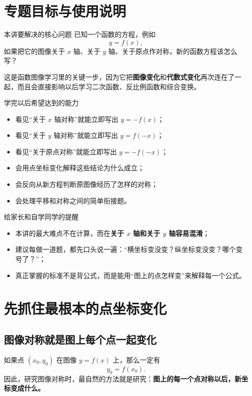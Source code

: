 \documentclass[11pt,a4paper,fontset=fandol]{ctexart}
\theoremstyle{formaltheorem}
\theoremstyle{formalexample}
\newcommand{\basef}{y=f(x)}
\begin{document}
\pagestyle{plain}
\tableofcontents
\newpage
\pagestyle{fancy}

\section{专题目标与使用说明}

\begin{goalbox}{本讲要解决的核心问题}
已知一个函数的方程，例如
\[
y=f(x),
\]
如果把它的图像关于 $x$ 轴、关于 $y$ 轴、关于原点作对称，新的函数方程该怎么写？

这是函数图像学习里的关键一步，因为它把\textbf{图像变化}和\textbf{代数式变化}再次连在了一起，而且会直接影响以后学习二次函数、反比例函数和综合变换。
\end{goalbox}

\begin{goalbox}{学完以后希望达到的能力}
\begin{itemize}
  \item 看见“关于 $x$ 轴对称”就能立即写出 $y=-f(x)$；
  \item 看见“关于 $y$ 轴对称”就能立即写出 $y=f(-x)$；
  \item 看见“关于原点对称”就能立即写出 $y=-f(-x)$；
  \item 会用点坐标变化解释这些结论为什么成立；
  \item 会反向从新方程判断原图像经历了怎样的对称；
  \item 会处理平移和对称之间的简单衔接题。
\end{itemize}
\end{goalbox}

\begin{notebox}{给家长和自学同学的提醒}
\begin{itemize}
  \item 本讲的最大难点不在计算，而在\textbf{关于 $x$ 轴和关于 $y$ 轴容易混淆}；
  \item 建议每做一道题，都先口头说一遍：“横坐标变没变？纵坐标变没变？哪个变号了？”；
  \item 真正掌握的标准不是背公式，而是能用“图上的点怎样变”来解释每一个公式。
\end{itemize}
\end{notebox}

\section{先抓住最根本的点坐标变化}

\subsection{图像对称就是图上每个点一起变化}
如果点 $(x_0,y_0)$ 在图像 $\basef$ 上，那么一定有
\[
y_0=f(x_0).
\]
因此，研究图像对称时，最自然的方法就是研究：\textbf{图上的每一个点对称以后，新坐标变成什么。}
\end{document}
